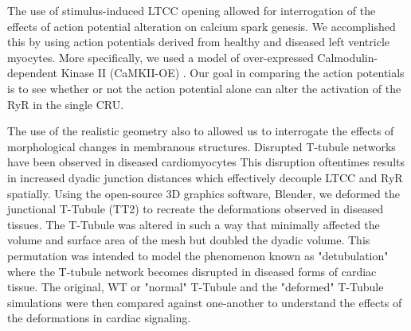 \documentclass[12pt]{ucsddissertation}
\begin{document}
The use of stimulus-induced LTCC opening allowed for interrogation of the effects of action potential alteration on calcium spark genesis. We accomplished this by using action potentials derived from healthy and diseased left ventricle myocytes. More specifically, we used a model of over-expressed Calmodulin-dependent Kinase II (CaMKII-OE) \cite{Hoch1999,Morotti2014}. Our goal in comparing the action potentials is to see whether or not the action potential alone can alter the activation of the RyR in the single CRU. 
 
The use of the realistic geometry also to allowed us to interrogate the effects of morphological changes in membranous structures. Disrupted T-tubule networks have been observed in diseased cardiomyocytes \cite{Louch2010,Ibrahim2011,Crossman2015} This disruption oftentimes results in increased dyadic junction distances \cite{Polakova2013} which effectively decouple LTCC and RyR spatially. Using the open-source 3D graphics software, Blender, we deformed the junctional T-Tubule (TT2) to recreate the deformations observed in diseased tissues. The T-Tubule was altered in such a way that minimally affected the volume and surface area of the mesh but doubled the dyadic volume. This permutation was intended to model the phenomenon known as "detubulation" where the T-tubule network becomes disrupted in diseased forms of cardiac tissue.  The original, WT or "normal" T-Tubule and the "deformed" T-Tubule simulations were then compared against one-another to understand the effects of the deformations in cardiac signaling. 
\end{document}
